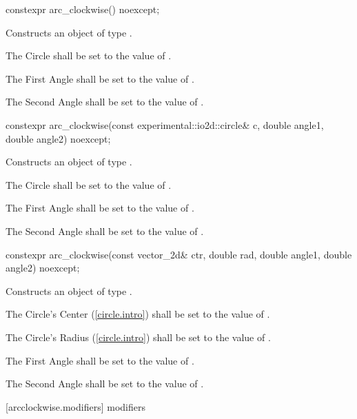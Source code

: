 \begin{itemdecl}
constexpr arc_clockwise() noexcept;
\end{itemdecl}
\begin{itemdescr}
\pnum
\effects
Constructs an object of type .

\pnum
The Circle shall be set to the value of .

\pnum
The First Angle shall be set to the value of .

\pnum
The Second Angle shall be set to the value of .
\end{itemdescr}

\begin{itemdecl}
constexpr arc_clockwise(const experimental::io2d::circle& c, double angle1,
  double angle2) noexcept;
\end{itemdecl}
\begin{itemdescr}
\pnum
\effects
Constructs an object of type .

\pnum
The Circle shall be set to the value of .

\pnum
The First Angle shall be set to the value of .

\pnum
The Second Angle shall be set to the value of .
\end{itemdescr}

\begin{itemdecl}
constexpr arc_clockwise(const vector_2d& ctr, double rad, double angle1,
  double angle2) noexcept;
\end{itemdecl}
\begin{itemdescr}
\pnum
\effects
Constructs an object of type .

\pnum
The Circle's Center (\ref{circle.intro}) shall be set to the value of .

\pnum
The Circle's Radius (\ref{circle.intro}) shall be set to the value of .

\pnum
The First Angle shall be set to the value of .

\pnum
The Second Angle shall be set to the value of .
\end{itemdescr}

 [arcclockwise.modifiers]{ modifiers}

